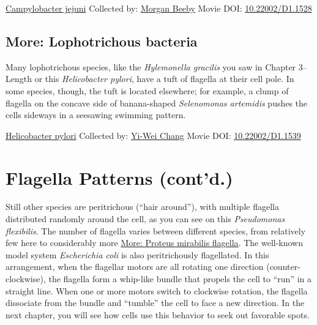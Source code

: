 \documentclass[]{tufte-book}
\begin{document}
\hypertarget{htmlwidget-957517a0e6d69c7495cf}{}

\label{fig:6-4}\protect\hyperlink{tree}{Campylobacter jejuni} Collected by: \protect\hyperlink{morgan_beeby}{Morgan Beeby} Movie DOI: \href{https://doi.org/10.22002/D1.1528}{10.22002/D1.1528}

\hypertarget{Lophotrichous_bacteria}{%
\subsection*{More: Lophotrichous bacteria}\label{Lophotrichous_bacteria}}

Many lophotrichous species, like the \emph{Hylemonella gracilis} you saw in Chapter 3--Length or this \emph{Helicobacter pylori}, have a tuft of flagella at their cell pole. In some species, though, the tuft is located elsewhere; for example, a clump of flagella on the concave side of banana-shaped \emph{Selenomonas artemidis} pushes the cells sideways in a seesawing swimming pattern.



\hypertarget{htmlwidget-92fd37288f47156137ef}{}

\label{fig:6-4a}\protect\hyperlink{tree}{Helicobacter pylori} Collected by: \protect\hyperlink{yi-wei_chang}{Yi-Wei Chang} Movie DOI: \href{https://doi.org/10.22002/D1.1539}{10.22002/D1.1539}

\hypertarget{flagella-patterns-contd.}{%
\section{Flagella Patterns (cont'd.)}\label{flagella-patterns-contd.}}

Still other species are peritrichous (``hair around''), with multiple flagella distributed randomly around the cell, as you can see on this \emph{Pseudomonas flexibilis}. The number of flagella varies between different species, from relatively few here to considerably more \protect\hyperlink{Proteus_mirabilis_flagella}{More: Proteus mirabilis flagella}. The well-known model system \emph{Escherichia coli} is also peritrichously flagellated. In this arrangement, when the flagellar motors are all rotating one direction (counter-clockwise), the flagella form a whip-like bundle that propels the cell to ``run'' in a straight line. When one or more motors switch to clockwise rotation, the flagella dissociate from the bundle and ``tumble'' the cell to face a new direction. In the next chapter, you will see how cells use this behavior to seek out favorable spots.
\end{document}
